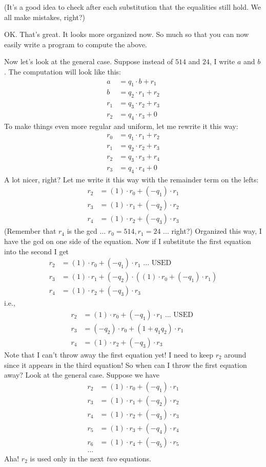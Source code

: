 (It's a good idea to check after each substitution that
the equalities still hold. We all make mistakes, right?)

OK.
That's great.
It looks more organized now.
So much so that you can now easily write a program to compute
the above.


Now let's look at the general case.
Suppose instead of $514$ and $24$, I write $a$ and $b$.
The computation will look like this:
\begin{align*}
a   &= q_1 \cdot b   + r_1 \\
b   &= q_2 \cdot r_1 + r_2 \\
r_1 &= q_3 \cdot r_2 + r_3 \\
r_2 &= q_4 \cdot r_3 + 0
\end{align*}
To make things even more regular and uniform, let me rewrite it this way:
\begin{align*}
r_0 &= q_1 \cdot r_1 + r_2 \\
r_1 &= q_2 \cdot r_2 + r_3 \\
r_2 &= q_3 \cdot r_3 + r_4 \\
r_3 &= q_4 \cdot r_4 + 0
\end{align*}
A lot nicer, right?
Let me write it this way with the remainder term on the lefts:
\begin{align*}
r_2 &= (1) \cdot r_0 + (-q_1) \cdot r_1 \\
r_3 &= (1) \cdot r_1 + (-q_2) \cdot r_2 \\
r_4 &= (1) \cdot r_2 + (-q_3) \cdot r_3 
\end{align*}
(Remember that $r_4$ is the gcd ... $r_0 = 514, r_1 = 24$ ... right?)
Organized this way, I have the gcd on one side of the equation.
Now if I substitute the first equation into the second I get
\begin{align*}
r_2 &= (1) \cdot r_0 + (-q_1) \cdot r_1 \text{ ... USED }\\
r_3 &= (1) \cdot r_1 + (-q_2) \cdot ((1) \cdot r_0 + (-q_1) \cdot r_1) \\
r_4 &= (1) \cdot r_2 + (-q_3) \cdot r_3 
\end{align*}
i.e.,
\begin{align*}
r_2 &= (1) \cdot r_0 + (-q_1) \cdot r_1 \text{ ... USED }\\
r_3 &= (-q_2) \cdot r_0 + (1 + q_1q_2) \cdot r_1 \\
r_4 &= (1) \cdot r_2 + (-q_3) \cdot r_3  
\end{align*}
Note that I can't throw away the first equation yet!
I need to keep $r_2$ around since it appears in the third equation!
So when can I throw the first equation away?
Look at the general case.
Suppose we have
\begin{align*}
r_2 &= (1) \cdot r_0 + (-q_1) \cdot r_1  \\
r_3 &= (1) \cdot r_1 + (-q_2) \cdot r_2  \\
r_4 &= (1) \cdot r_2 + (-q_3) \cdot r_3  \\
r_5 &= (1) \cdot r_3 + (-q_4) \cdot r_4  \\
r_6 &= (1) \cdot r_4 + (-q_5) \cdot r_5  \\
...
\end{align*}
Aha! $r_2$ is used only in the next \textit{two} equations.

